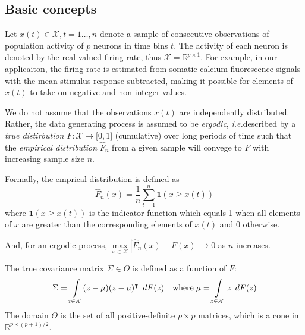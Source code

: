 \subsection{Basic concepts}
Let $x(t) \in \mathcal X, t=1\ldots,n$ denote a sample of consecutive observations of population activity of $p$ neurons in time bins $t$.  
The activity of each neuron is denoted by the real-valued firing rate, thus  $\mathcal X = \mathbb R^{p\times 1}$.  
For example, in our applicaiton, the firing rate is estimated from somatic calcium fluorescence signals with the mean stimulus response subtracted, making it possible for elements of $x(t)$ to take on negative and non-integer values. 

We do not assume that the observations $x(t)$ are independently distributed. Rather, the data generating process is assumed to be \emph{ergodic}, \emph{i.e.}\;described by a \emph{true distirbution} $F: \mathcal X \mapsto  \mathbb [0, 1]$ (cumulative) over long periods of time such that the \emph{empirical distribution} $\hat F_n$ from a given sample will convege to $F$ with increasing sample size $n$.

Formally, the emprical distribution is defined as 
\begin{equation}
\hat F_n(x) = \frac 1 n \sum\limits_{t=1}^n \mathbf{1}(x \ge x(t))
\end{equation}
where $\mathbf 1(x \ge x(t))$ is the indicator function which equals 1 when all elements of $x$ are greater than the corresponding elements of $x(t)$ and 0 otherwise. 

And, for an ergodic process, $\max\limits_{x\in\mathcal X} \left|\hat F_n(x) - F(x)\right| \to 0$ as $n$ increases.

The true covariance matrix $\Sigma \in \Theta$ is defined as a function of $F$:
\begin{equation}
\Sigma = \int\limits_{z\in\mathcal X} (z - \mu)(z - \mu)^\intercal \mathop{}\,d F(z)
\quad\mbox{where}\;
\mu = \int\limits_{z\in\mathcal X} z \mathop{}\,d F(z)
\end{equation}
The domain $\Theta$ is the set of all positive-definite $p\times p$ matrices, which is a cone in $\mathbb R^{p\times(p+1)/2}$.

